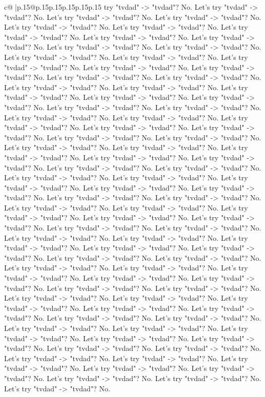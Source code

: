 \documentclass{article}
\begin{document}
{\begin{supertabular}{c@{$\;$}|p{.15\linewidth}@{}p{.15\linewidth}p{.15\linewidth}p{.15\linewidth}p{.15\linewidth}p{.15\linewidth}}
{{{try "tvdad" {-}> "tvdad"? No. Let's try "tvdad" {-}> "tvdad"? No. Let's try "tvdad" {-}> "tvdad"? No. Let's try "tvdad" {-}> "tvdad"? No. Let's try "tvdad" {-}> "tvdad"? No. Let's try "tvdad" {-}> "tvdad"? No. Let's try "tvdad" {-}> "tvdad"? No. Let's try "tvdad" {-}> "tvdad"? No. Let's try "tvdad" {-}> "tvdad"? No. Let's try "tvdad" {-}> "tvdad"? No. Let's try "tvdad" {-}> "tvdad"? No. Let's try "tvdad" {-}> "tvdad"? No. Let's try "tvdad" {-}> "tvdad"? No. Let's try "tvdad" {-}> "tvdad"? No. Let's try "tvdad" {-}> "tvdad"? No. Let's try "tvdad" {-}> "tvdad"? No. Let's try "tvdad" {-}> "tvdad"? No. Let's try "tvdad" {-}> "tvdad"? No. Let's try "tvdad" {-}> "tvdad"? No. Let's try "tvdad" {-}> "tvdad"? No. Let's try "tvdad" {-}> "tvdad"? No. Let's try "tvdad" {-}> "tvdad"? No. Let's try "tvdad" {-}> "tvdad"? No. Let's try "tvdad" {-}> "tvdad"? No. Let's try "tvdad" {-}> "tvdad"? No. Let's try "tvdad" {-}> "tvdad"? No. Let's try "tvdad" {-}> "tvdad"? No. Let's try "tvdad" {-}> "tvdad"? No. Let's try "tvdad" {-}> "tvdad"? No. Let's try "tvdad" {-}> "tvdad"? No. Let's try "tvdad" {-}> "tvdad"? No. Let's try "tvdad" {-}> "tvdad"? No. Let's try "tvdad" {-}> "tvdad"? No. Let's try "tvdad" {-}> "tvdad"? No. Let's try "tvdad" {-}> "tvdad"? No. Let's try "tvdad" {-}> "tvdad"? No. Let's try "tvdad" {-}> "tvdad"? No. Let's try "tvdad" {-}> "tvdad"? No. Let's try "tvdad" {-}> "tvdad"? No. Let's try "tvdad" {-}> "tvdad"? No. Let's try "tvdad" {-}> "tvdad"? No. Let's try "tvdad" {-}> "tvdad"? No. Let's try "tvdad" {-}> "tvdad"? No. Let's try "tvdad" {-}> "tvdad"? No. Let's try "tvdad" {-}> "tvdad"? No. Let's try "tvdad" {-}> "tvdad"? No. Let's try "tvdad" {-}> "tvdad"? No. Let's try "tvdad" {-}> "tvdad"? No. Let's try "tvdad" {-}> "tvdad"? No. Let's try "tvdad" {-}> "tvdad"? No. Let's try "tvdad" {-}> "tvdad"? No. Let's try "tvdad" {-}> "tvdad"? No. Let's try "tvdad" {-}> "tvdad"? No. Let's try "tvdad" {-}> "tvdad"? No. Let's try "tvdad" {-}> "tvdad"? No. Let's try "tvdad" {-}> "tvdad"? No. Let's try "tvdad" {-}> "tvdad"? No. Let's try "tvdad" {-}> "tvdad"? No. Let's try "tvdad" {-}> "tvdad"? No. Let's try "tvdad" {-}> "tvdad"? No. Let's try "tvdad" {-}> "tvdad"? No. Let's try "tvdad" {-}> "tvdad"? No. Let's try "tvdad" {-}> "tvdad"? No. Let's try "tvdad" {-}> "tvdad"? No. Let's try "tvdad" {-}> "tvdad"? No. Let's try "tvdad" {-}> "tvdad"? No. Let's try "tvdad" {-}> "tvdad"? No. Let's try "tvdad" {-}> "tvdad"? No. Let's try "tvdad" {-}> "tvdad"? No. Let's try "tvdad" {-}> "tvdad"? No. Let's try "tvdad" {-}> "tvdad"? No. Let's try "tvdad" {-}> "tvdad"? No. Let's try "tvdad" {-}> "tvdad"? No. Let's try "tvdad" {-}> "tvdad"? No. Let's try "tvdad" {-}> "tvdad"? No. Let's try "tvdad" {-}> "tvdad"? No. Let's try "tvdad" {-}> "tvdad"? No. Let's try "tvdad" {-}> "tvdad"? No. Let's try "tvdad" {-}> "tvdad"? No. Let's try "tvdad" {-}> "tvdad"? No. Let's try "tvdad" {-}> "tvdad"? No. Let's try "tvdad" {-}> "tvdad"? No. Let's try "tvdad" {-}> "tvdad"? No. Let's try "tvdad" {-}> "tvdad"? No. Let's try "tvdad" {-}> "tvdad"? No. Let's try "tvdad" {-}> "tvdad"? No. Let's try "tvdad" {-}> "tvdad"? No. Let's try "tvdad" {-}> "tvdad"? No. Let's try "tvdad" {-}> "tvdad"? No. }}}
\end{supertabular}}
\end{document}
